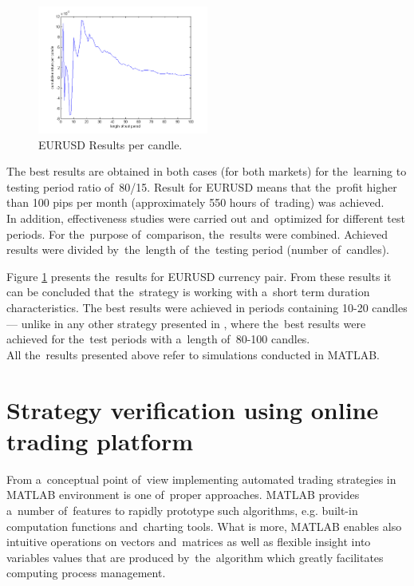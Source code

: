 \documentclass[runningheads,a4paper]{llncs}
\begin{document}
\begin{figure}[h!]
\centering
\includegraphics[width = 0.5\textwidth]{figures/rys10.png}
\caption{EURUSD Results per candle.}
\label{fig:fig10}
\end{figure}
\FloatBarrier

The best results are obtained in both cases (for both markets) for the~learning to testing period ratio of~80/15. Result for EURUSD means that the~profit higher than 100 pips per month (approximately 550 hours of~trading) was achieved.\\

In addition, effectiveness studies were carried out and~optimized for different test periods. For the~purpose of~comparison, the~results were combined. Achieved results were divided by~the~length of~the~testing period (number of~candles). 

Figure \ref{fig:fig10} presents the~results for EURUSD currency pair. From these results it can be concluded that the~strategy is working with a~short term duration characteristics. The best results were achieved in periods containing 10-20 candles --- unlike in any other strategy presented in \cite{Wilinski2014}, where the~best results were achieved for the~test periods with a~length of~80-100 candles.\\
All the~results presented above refer to simulations conducted in MATLAB.


\section{Strategy verification using online trading platform}
From a~conceptual point of~view implementing automated trading strategies in MATLAB environment is one of~proper approaches. MATLAB provides a~number of~features to rapidly prototype such algorithms, e.g. built-in computation functions and~charting tools. What is more, MATLAB enables also intuitive operations on vectors and~matrices as well as flexible insight into variables values that are produced by~the~algorithm which greatly facilitates computing process management.\\
\end{document}
